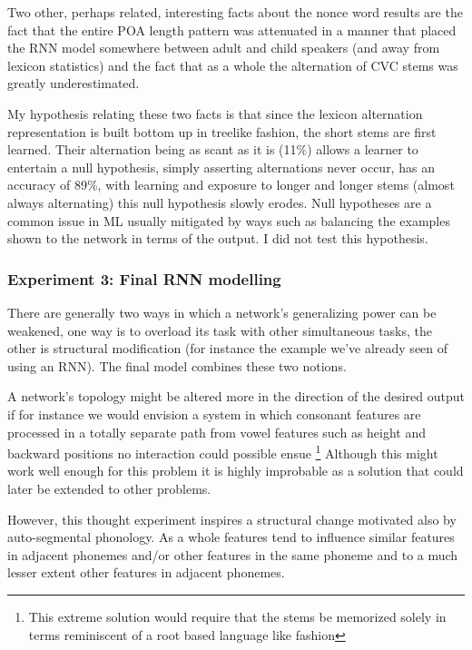 \documentclass[a4paper,12pt]{article}
\begin{document}
Two other, perhaps related, interesting facts about the nonce word results are the fact that the
entire POA length pattern was attenuated in a manner that placed the RNN model somewhere between
adult and child speakers (and away from lexicon statistics) and the fact that as a whole the
alternation of CVC stems was greatly underestimated.

My hypothesis relating these two facts is that since the lexicon alternation representation is built
bottom up in treelike fashion, the short stems are first learned. Their alternation being as scant
as it is (11\%) allows a learner to entertain a null hypothesis, simply asserting alternations never
occur, has an accuracy of 89\%, with learning and exposure to longer and longer stems (almost always
alternating) this null hypothesis slowly erodes. Null hypotheses are a common issue in ML usually
mitigated by ways such as balancing the examples shown to the network in terms of the output. I
did not test this hypothesis.

\subsubsection{Experiment 3: Final RNN modelling}

There are generally two ways in which a network's generalizing power can be weakened, one way is to
overload its task with other simultaneous tasks, the other is structural modification (for instance
the example we've already seen of using an RNN). The final model combines these two notions.

A network's topology might be altered more in the direction of the desired output if for instance we
would envision a system in which consonant features are processed in a totally separate path from
vowel features such as height and backward positions no interaction could possible ensue
\footnote{This extreme solution would require that the stems be memorized solely in terms
reminiscent of  a root based language like fashion} Although this might work well enough for this
problem it is highly improbable as a solution that could later be extended to other problems.

However, this thought experiment inspires a structural change motivated also by auto-segmental
phonology. As a whole features tend to influence similar features in adjacent phonemes and/or other
features in the same phoneme and to a much lesser extent other features in adjacent phonemes.
\end{document}
